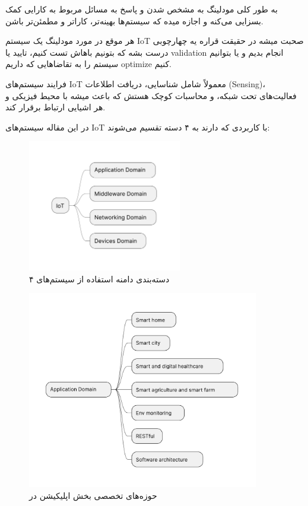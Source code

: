 \documentclass[a4paper]{article}
\begin{document}
به طور کلی مودلینگ به مشخص شدن و پاسخ به مسائل مربوط به کارایی کمک بسزایی می‌کنه
و اجازه میده که سیستم‌ها بهینه‌تر، کاراتر و مطمئن‌تر باشن.

هر موقع در مورد مودلینگ یک سیستم IoT صحبت میشه در حقیقت قراره یه چهارچوبی درست
بشه که بتونیم باهاش تست کنیم، تایید یا validation انجام بدیم و یا بتوانیم سیستم
را به تقاضا‌هایی که داریم optimize کنیم.

فرایند سیستم‌های IoT معمولاً شامل شناسایی، دریافت اطلاعات (Sensing)، فعالیت‌های
تحت شبکه، و محاسبات کوچک هستش که باعث میشه با محیط فیزیکی و هر اشیایی ارتباط
برقرار کند.

در این مقاله سیستم‌های IoT با کاربردی که دارند به ۴ دسته تقسیم می‌شوند:

\begin{figure}[H]
  \centering
  \includegraphics[width=0.6\textwidth]{./figures/IoT_overall_domains.pdf}
  \caption{۴ دسته‌بندی دامنه استفاده از سیستم‌های }
  \label{fig:iotOverallDomains}
\end{figure}

\begin{figure}[H]
  \centering
  \includegraphics[width=0.9\textwidth]{./figures/IoT_application_domains.pdf}
  \caption{حوزه‌های تخصصی بخش اپلیکیشن در }
  \label{fig:iotApplicationDomains}
\end{figure}
\end{document}
